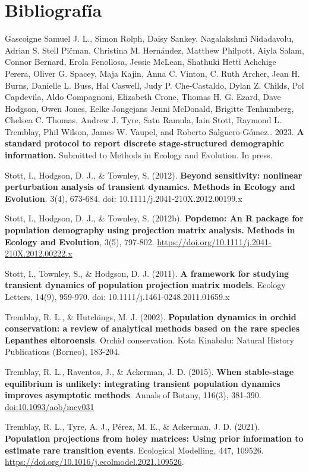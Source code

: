 \documentclass[
]{book}
\theoremstyle{definition}
\theoremstyle{definition}
\theoremstyle{definition}
\theoremstyle{definition}
\theoremstyle{remark}
\begin{document}
\hypertarget{bibliografuxeda}{%
\section{Bibliografía}\label{bibliografuxeda}}

Gascoigne Samuel J. L., Simon Rolph, Daisy Sankey, Nagalakshmi
Nidadavolu, Adrian S. Stell Pičman, Christina M. Hernández, Matthew
Philpott, Aiyla Salam, Connor Bernard, Erola Fenollosa, Jessie McLean,
Shathuki Hetti Achchige Perera, Oliver G. Spacey, Maja Kajin, Anna C.
Vinton, C. Ruth Archer, Jean H. Burns, Danielle L. Buss, Hal Caswell,
Judy P. Che-Castaldo, Dylan Z. Childs, Pol Capdevila, Aldo Compagnoni,
Elizabeth Crone, Thomas H. G. Ezard, Dave Hodgson, Owen Jones, Eelke
Jongejans Jenni McDonald, Brigitte Tenhumberg, Chelsea C. Thomas, Andrew
J. Tyre, Satu Ramula, Iain Stott, Raymond L. Tremblay, Phil Wilson,
James W. Vaupel, and Roberto Salguero-Gómez.. 2023. \textbf{A standard
protocol to report discrete stage-structured demographic information.}
Submitted to Methods in Ecology and Evolution. In press.

Stott, I., Hodgson, D. J., \& Townley, S. (2012). \textbf{Beyond sensitivity:
nonlinear perturbation analysis of transient dynamics. Methods in
Ecology and Evolution}. 3(4), 673-684. doi:
10.1111/j.2041-210X.2012.00199.x

Stott, I., Hodgson, D. J., \& Townley, S. (2012b). \textbf{Popdemo: An R
package for population demography using projection matrix analysis.
Methods in Ecology and Evolution}, 3(5), 797-802.
\url{https://doi.org/10.1111/j.2041-210X.2012.00222.x}

Stott, I., Townley, S., \& Hodgson, D. J. (2011). \textbf{A framework for
studying transient dynamics of population projection matrix models}.
Ecology Letters, 14(9), 959-970. doi: 10.1111/j.1461-0248.2011.01659.x

Tremblay, R. L., \& Hutchings, M. J. (2002). \textbf{Population dynamics in
orchid conservation: a review of analytical methods based on the rare
species Lepanthes eltoroensis}. Orchid conservation. Kota Kinabalu:
Natural History Publications (Borneo), 183-204.

Tremblay, R. L., Raventos, J., \& Ackerman, J. D. (2015). \textbf{When
stable-stage equilibrium is unlikely: integrating transient population
dynamics improves asymptotic methods}. Annals of Botany, 116(3),
381-390. \url{doi:10.1093/aob/mcv031}

Tremblay, R. L., Tyre, A. J., Pérez, M. E., \& Ackerman, J. D. (2021).
\textbf{Population projections from holey matrices: Using prior information to
estimate rare transition events}. Ecological Modelling, 447, 109526.
\url{https://doi.org/10.1016/j.ecolmodel.2021.109526}.
\end{document}
